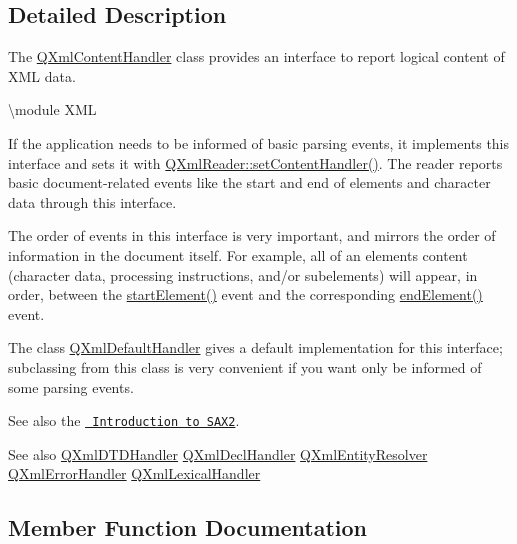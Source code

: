\subsection{Detailed Description}
The \mbox{\hyperlink{class_q_xml_content_handler}{Q\+Xml\+Content\+Handler}} class provides an interface to report logical content of X\+ML data. 

\textbackslash{}module X\+ML

If the application needs to be informed of basic parsing events, it implements this interface and sets it with \mbox{\hyperlink{class_q_xml_reader_a767bc5a20ea120ffc2d60f5c42fb28cd}{Q\+Xml\+Reader\+::set\+Content\+Handler()}}. The reader reports basic document-\/related events like the start and end of elements and character data through this interface.

The order of events in this interface is very important, and mirrors the order of information in the document itself. For example, all of an element\textquotesingle{}s content (character data, processing instructions, and/or subelements) will appear, in order, between the \mbox{\hyperlink{class_q_xml_content_handler_af6d4e631fad2b9b75622c95003b1da55}{start\+Element()}} event and the corresponding \mbox{\hyperlink{class_q_xml_content_handler_af0abc06326798a6e522f91e6174b7b9e}{end\+Element()}} event.

The class \mbox{\hyperlink{class_q_xml_default_handler}{Q\+Xml\+Default\+Handler}} gives a default implementation for this interface; subclassing from this class is very convenient if you want only be informed of some parsing events.

See also the \href{xml.html\#introSAX2}{\texttt{ Introduction to S\+A\+X2}}.

\begin{DoxySeeAlso}{See also}
\mbox{\hyperlink{class_q_xml_d_t_d_handler}{Q\+Xml\+D\+T\+D\+Handler}} \mbox{\hyperlink{class_q_xml_decl_handler}{Q\+Xml\+Decl\+Handler}} \mbox{\hyperlink{class_q_xml_entity_resolver}{Q\+Xml\+Entity\+Resolver}} \mbox{\hyperlink{class_q_xml_error_handler}{Q\+Xml\+Error\+Handler}} \mbox{\hyperlink{class_q_xml_lexical_handler}{Q\+Xml\+Lexical\+Handler}} 
\end{DoxySeeAlso}


\subsection{Member Function Documentation}
\mbox{\label{class_q_xml_content_handler_a3be0d440b48836560c8805e15d596eb1}} 
